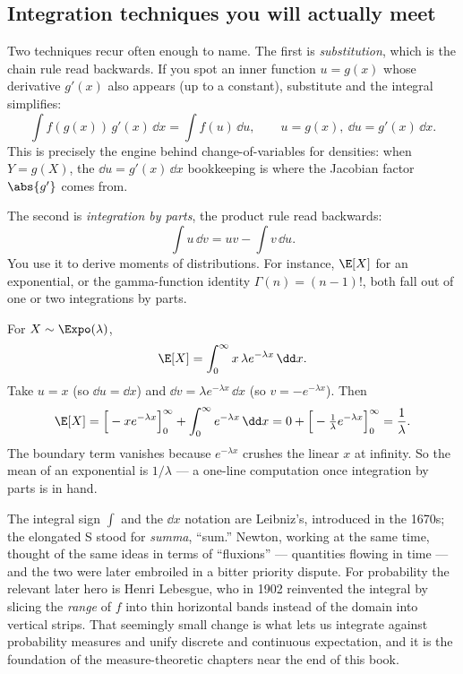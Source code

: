 \subsection{Integration techniques you will actually meet}
\label{chAcla:techniques}

Two techniques recur often enough to name. The first is \emph{substitution}, which is the chain rule
read backwards. If you spot an inner function $u=g(x)$ whose derivative $g'(x)$ also appears (up to a
constant), substitute and the integral simplifies:
\[
  \int f(g(x))\,g'(x)\,\dd x = \int f(u)\,\dd u, \qquad u=g(x),\ \dd u = g'(x)\,\dd x.
\]
This is precisely the engine behind change-of-variables for densities: when $Y=g(X)$, the $\dd u =
g'(x)\,\dd x$ bookkeeping is where the Jacobian factor $\abs{g'}$ comes from.

The second is \emph{integration by parts}, the product rule read backwards:
\[
  \int u\,\dd v = uv - \int v\,\dd u.
\]
You use it to derive moments of distributions. For instance, $\E[X]$ for an exponential, or the
gamma-function identity $\Gamma(n)=(n-1)!$, both fall out of one or two integrations by parts.

\begin{example}
\label{chAcla:ex-mean-expo}
For $X\sim\Expo(\lambda)$,
\[
  \E[X]=\int_0^\infty x\,\lambda e^{-\lambda x}\,\dd x.
\]
Take $u=x$ (so $\dd u=\dd x$) and $\dd v=\lambda e^{-\lambda x}\,\dd x$ (so $v=-e^{-\lambda x}$).
Then
\[
  \E[X]=\Big[-x e^{-\lambda x}\Big]_0^\infty + \int_0^\infty e^{-\lambda x}\,\dd x
  = 0 + \Big[-\tfrac1\lambda e^{-\lambda x}\Big]_0^\infty = \frac1\lambda.
\]
The boundary term vanishes because $e^{-\lambda x}$ crushes the linear $x$ at infinity. So the mean
of an exponential is $1/\lambda$ --- a one-line computation once integration by parts is in hand.
\end{example}

\begin{historybox}
The integral sign $\int$ and the $\dd x$ notation are Leibniz's, introduced in the 1670s; the
elongated S stood for \emph{summa}, ``sum.'' Newton, working at the same time, thought of the same
ideas in terms of ``fluxions'' --- quantities flowing in time --- and the two were later embroiled in
a bitter priority dispute. For probability the relevant later hero is Henri Lebesgue, who in 1902
reinvented the integral by slicing the \emph{range} of $f$ into thin horizontal bands instead of the
domain into vertical strips. That seemingly small change is what lets us integrate against
probability measures and unify discrete and continuous expectation, and it is the foundation of the
measure-theoretic chapters near the end of this book.
\end{historybox}


